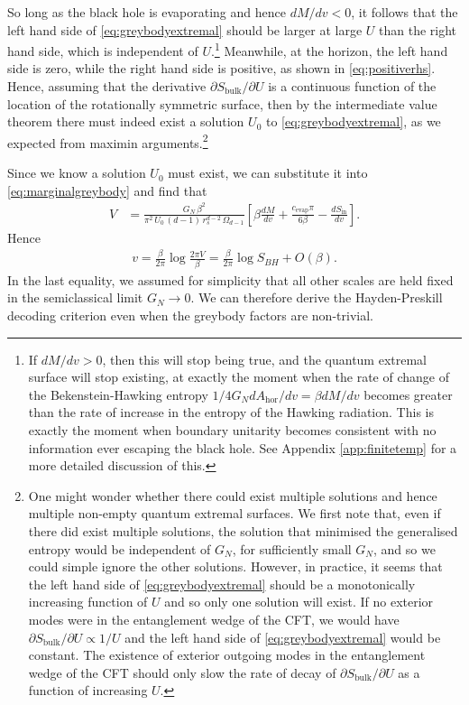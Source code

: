 \documentclass[11pt,a4paper]{article}
\begin{document}
So long as the black hole is evaporating and hence $dM/dv < 0$, it follows that the left hand side of \eqref{eq:greybodyextremal} should be larger at large $U$ than the right hand side, which is independent of $U$.\footnote{If $dM/dv > 0$, then this will stop being true, and the quantum extremal surface will stop existing, at exactly the moment when the rate of change of the Bekenstein-Hawking entropy $1/ 4G_N dA_\text{hor}/dv = \beta dM/dv$ becomes greater than the rate of increase in the entropy of the Hawking radiation. This is exactly the moment when boundary unitarity becomes consistent with no information ever escaping the black hole. See Appendix \ref{app:finitetemp} for a more detailed discussion of this.} Meanwhile, at the horizon, the left hand side is zero, while the right hand side is positive, as shown in \eqref{eq:positiverhs}. Hence, assuming that the derivative $\partial S_\text{bulk}/ \partial U$ is a continuous function of the location of the rotationally symmetric surface, then by the intermediate value theorem there must indeed exist a solution $U_0$ to \eqref{eq:greybodyextremal}, as we expected from maximin arguments.\footnote{One might wonder whether there could exist multiple solutions and hence multiple non-empty quantum extremal surfaces. We first note that, even if there did exist multiple solutions, the solution that minimised the generalised entropy would be independent of $G_N$, for sufficiently small $G_N$, and so we could simple ignore the other solutions. However, in practice, it seems that the left hand side of \eqref{eq:greybodyextremal} should be a monotonically increasing function of $U$ and so only one solution will exist. If no exterior modes were in the entanglement wedge of the CFT, we would have $\partial S_\text{bulk}/\partial U \propto 1/U$ and the left hand side of \eqref{eq:greybodyextremal} would be constant. The existence of exterior outgoing modes in the entanglement wedge of the CFT should only slow the rate of decay of $\partial S_\text{bulk}/\partial U$ as a function of increasing $U$.}
 
Since we know a solution $U_0$ must exist, we can substitute it into \eqref{eq:marginalgreybody} and find that
\begin{align}
V &=  \frac{G_N \,\beta^2}{\pi^2\,U_0\,(d-1)\, r_s^{d-2} \,\Omega_{d-1}}\left[\beta \frac{d M}{d v} + \frac{c_\text{evap} \pi}{6 \beta} - \frac{d S_\text{in}}{d v}\right].
\end{align}
Hence
\begin{align}
v = \frac{\beta}{2 \pi} \log \frac{2 \pi V}{\beta} = \frac{\beta}{2 \pi} \log S_{BH} + O(\beta).
\end{align}
In the last equality, we assumed for simplicity that all other scales are held fixed in the semiclassical limit $G_N \to 0$. We can therefore derive the Hayden-Preskill decoding criterion even when the greybody factors are non-trivial. 
\end{document}
